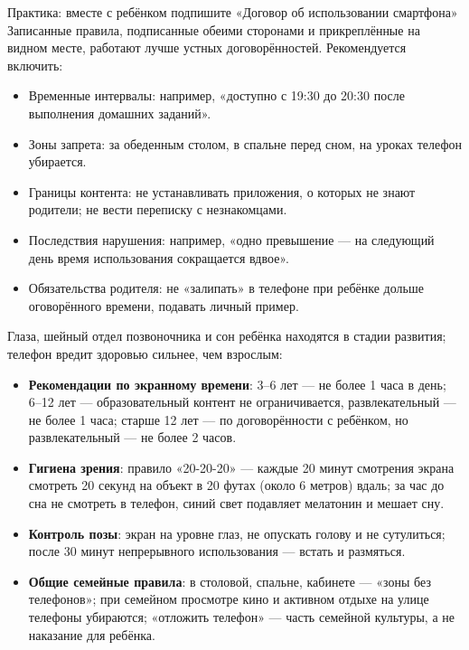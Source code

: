 \begin{tcbpractice}{Практика: вместе с ребёнком подпишите «Договор об использовании смартфона»}
Записанные правила, подписанные обеими сторонами и прикреплённые на видном месте, работают лучше устных договорённостей. Рекомендуется включить:

\begin{itemize}
  \item Временные интервалы: например, «доступно с 19:30 до 20:30 после выполнения домашних заданий».
  \item Зоны запрета: за обеденным столом, в спальне перед сном, на уроках телефон убирается.
  \item Границы контента: не устанавливать приложения, о которых не знают родители; не вести переписку с незнакомцами.
  \item Последствия нарушения: например, «одно превышение — на следующий день время использования сокращается вдвое».
  \item Обязательства родителя: не «залипать» в телефоне при ребёнке дольше оговорённого времени, подавать личный пример.
\end{itemize}

\end{tcbpractice}


Глаза, шейный отдел позвоночника и сон ребёнка находятся в стадии развития; телефон вредит здоровью сильнее, чем взрослым:

\begin{itemize}
  \item \textbf{Рекомендации по экранному времени}: 3–6 лет — не более 1 часа в день; 6–12 лет — образовательный контент не ограничивается, развлекательный — не более 1 часа; старше 12 лет — по договорённости с ребёнком, но развлекательный — не более 2 часов.
  \item \textbf{Гигиена зрения}: правило «20-20-20» — каждые 20 минут смотрения экрана смотреть 20 секунд на объект в 20 футах (около 6 метров) вдаль; за час до сна не смотреть в телефон, синий свет подавляет мелатонин и мешает сну.
  \item \textbf{Контроль позы}: экран на уровне глаз, не опускать голову и не сутулиться; после 30 минут непрерывного использования — встать и размяться.
  \item \textbf{Общие семейные правила}: в столовой, спальне, кабинете — «зоны без телефонов»; при семейном просмотре кино и активном отдыхе на улице телефоны убираются; «отложить телефон» — часть семейной культуры, а не наказание для ребёнка.
\end{itemize}

